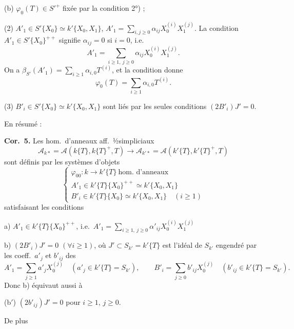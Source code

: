 \documentclass[11pt,a4paper]{article}
\begin{document}
(b) $\varphi_{0}(T)\in S'^{+}$  \ill{} fixée par la condition 2°) ; 


(2) $A'_{1}\in S'\{X_{0}\}\simeq k'\{X_{0},X_{1}\}$, $A'_{1}=\sum_{i,j\geq 0}\alpha_{ij}X_{0}^{(i)}X_{1}^{(j)}$. La condition $A'_{1}\in S'\{X_{0}\}^{++}$ signifie $\alpha_{ij}=0$ si $i=0$, i.e.
\[
A'_{1}=\sum_{i\geq 1,\ j\geq 0}\alpha_{ij}X_{0}^{(i)}X_{1}^{(j)}.
\]
On a $\beta_{S'}(A'_{1})=\sum_{i\geq 1}\alpha_{i,0}T^{(i)}$, et la condition donne
\[
\varphi_{0}(T)=\sum_{i\geq 1}\alpha_{i,0}T^{(i)}.
\]

(3) $B'_{i}\in S'\{X_{0}\}\simeq k'\{X_{0},X_{1}\}$ sont liés par les seules conditions $(2B'_{i})J'=0$.

En résumé :

\textbf{Cor.\ 5.} Les hom.\ d'anneaux aff.\ ½simpliciaux
\[
\mathcal{A}_{k*}=\mathcal{A}(k\{T\},k\{T\}^{+},T)\to\mathcal{A}_{k'*}=\mathcal{A}(k'\{T\},k'\{T\}^{+},T)
\]
sont définis par les systèmes d'objets
\[
\begin{cases}
\varphi_{00}\colon k\to k'\{T\}\ \text{hom.\ d'anneaux}\\
A'_{1}\in k'\{T\}\{X_{0}\}^{++}\simeq k'\{X_{0},X_{1}\}\\
B'_{i}\in k'\{T\}\{X_{0}\}\simeq k'\{X_{0},X_{1}\}\quad (i\geq 1)
\end{cases}
\]
satisfaisant les conditions

a) $A'_{1}\in k'\{T\}\{X_{0}\}^{++}$, i.e.\ $A'_{1}=\sum_{i\geq 1,\ j\geq 0}\alpha'_{ij}X_{0}^{(i)}X_{1}^{(j)}$

b) $(2B'_{i})J'=0$ $(\forall i\geq 1)$, où $J'\subset S_{k'}=k'\{T\}$ est l'idéal de $S_{k'}$ engendré par les coeff.\ $a'_{j}$ et $b'_{ij}$ \struck{\ill{}} des
\[
A'_{1}=\sum_{j\geq 1}a'_{j}X_{0}^{(j)}\quad (a'_{j}\in k'\{T\}=S_{k'}),\qquad
B'_{i}=\sum_{j\geq 0}b'_{ij}X_{0}^{(j)}\quad (b'_{ij}\in k'\{T\}=S_{k'}).
\]
Donc b) équivaut aussi à

(b$'$) $(2b'_{ij})J'=0$ pour $i\geq 1$, $j\geq 0$.

De plus
\end{document}

